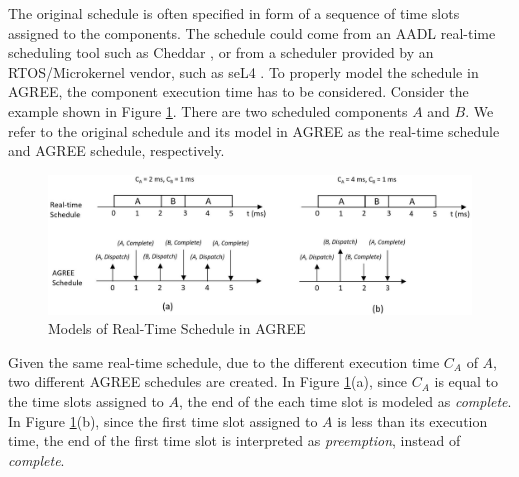 The original schedule is often specified in form of a sequence of time slots assigned to the components. 
The schedule could come from an AADL real-time scheduling tool such as Cheddar \cite{cheddar}, or from a scheduler provided by an RTOS/Microkernel vendor, such as seL4 \cite{sel4}. 
To properly model the schedule in AGREE, the component execution time has to be considered. Consider the example shown in Figure \ref{RTschedule}. There are two scheduled components $A$ and $B$. We refer to the original schedule and its model in AGREE as the real-time schedule and AGREE schedule, respectively.
\begin{figure}[t!]
\centering
\includegraphics[width=130mm]{RTschedule.jpg}
\caption{Models of Real-Time Schedule in AGREE\label{RTschedule}}
\end{figure}
Given the same real-time schedule, due to the different execution time $C_A$ of $A$, two different AGREE schedules are created. In Figure \ref{RTschedule}(a), since $C_A$ is equal to the time slots assigned to $A$, the end of the each time slot is modeled as \emph{complete}. In Figure \ref{RTschedule}(b), since the first time slot assigned to $A$ is less than its execution time, the end of the first time slot is interpreted as \emph{preemption}, instead of \emph{complete}.



